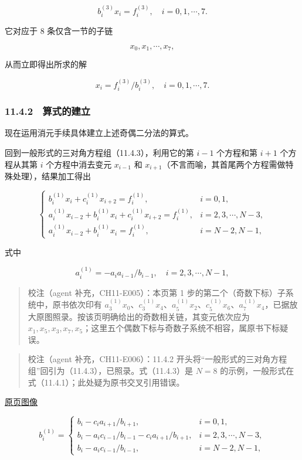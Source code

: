 \documentclass[
  10pt,
  fontset=fandol]{ctexart}
\begin{document}
\[
b_i^{(3)}x_i=f_i^{(3)},\quad i=0,1,\cdots,7.
\]

它对应于 8 条仅含一节的子链

\[
x_0,x_1,\cdots,x_7,
\]

从而立即得出所求的解

\[
x_i=f_i^{(3)}/b_i^{(3)},\quad i=0,1,\cdots,7.
\]

\subsubsection{11.4.2　算式的建立}\label{ux7b97ux5f0fux7684ux5efaux7acb-1}

现在运用消元手续具体建立上述奇偶二分法的算式。

回到一般形式的三对角方程组（11.4.3），利用它的第 \(i-1\) 个方程和第 \(i+1\) 个方程从其第 \(i\) 个方程中消去变元 \(x_{i-1}\) 和 \(x_{i+1}\)（不言而喻，其首尾两个方程需做特殊处理），结果加工得出

\[
\begin{cases}
b_i^{(1)}x_i+c_i^{(1)}x_{i+2}=f_i^{(1)},& i=0,1,\\
a_i^{(1)}x_{i-2}+b_i^{(1)}x_i+c_i^{(1)}x_{i+2}=f_i^{(1)},& i=2,3,\cdots,N-3,\\
a_i^{(1)}x_{i-2}+b_i^{(1)}x_i=f_i^{(1)},& i=N-2,N-1,
\end{cases}
\]

式中

\[
a_i^{(1)}=-a_i a_{i-1}/b_{i-1},\quad i=2,3,\cdots,N-1,
\]

\begin{quote}
校注（agent 补充，CH11-E005）：本页第 1 步的第二个（奇数下标）子系统中，原书依次印有 \(a_3^{(1)}x_0\)、\(c_3^{(1)}x_4\)、\(a_5^{(1)}x_2\)、\(c_5^{(1)}x_6\)、\(a_7^{(1)}x_4\)，已据放大原图照录。按该页明确给出的奇数相关链，其变元依次应为 \(x_1,x_5,x_3,x_7,x_5\)；这里五个偶数下标与奇数子系统不相容，属原书下标疑误。
\end{quote}

\begin{quote}
校注（agent 补充，CH11-E006）：11.4.2 开头将``一般形式的三对角方程组''回引为（11.4.3），已照录。式（11.4.3）是 \(N=8\) 的示例，一般形式在式（11.4.1）；此处疑为原书交叉引用错误。
\end{quote}

\href{../../source-images/pdf-291.jpeg}{原页图像}

\[
b_i^{(1)}=
\begin{cases}
b_i-c_i a_{i+1}/b_{i+1},& i=0,1,\\
b_i-a_i c_{i-1}/b_{i-1}-c_i a_{i+1}/b_{i+1},& i=2,3,\cdots,N-3,\\
b_i-a_i c_{i-1}/b_{i-1},& i=N-2,N-1,
\end{cases}
\]
\end{document}
